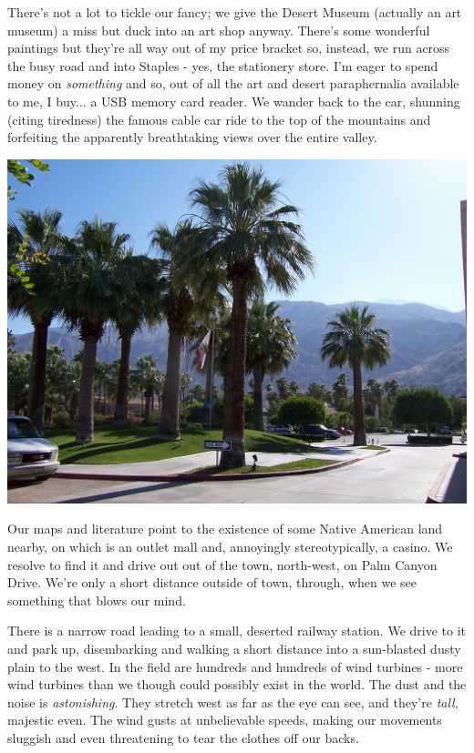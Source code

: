 \documentclass[a5paper,titlepage,11pt]{book}
\begin{document}
There's not a lot to tickle our fancy; we give the Desert Museum (actually an art museum) a miss but duck into an art shop anyway.  There's some wonderful paintings but they're all way out of my price bracket so, instead, we run across the busy road and into Staples - yes, the stationery store.  I'm eager to spend money on \emph{something} and so, out of all the art and desert paraphernalia available to me, I buy... a USB memory card reader.  We wander back to the car, shunning (citing tiredness) the famous cable car ride to the top of the mountains and forfeiting the apparently breathtaking views over the entire valley.

\begin{center}\includegraphics[width=\textwidth]{gfx/100_1625}\end{center}

Our maps and literature point to the existence of some Native American land nearby, on which is an outlet mall and, annoyingly stereotypically, a casino.  We resolve to find it and drive out out of the town, north-west, on Palm Canyon Drive. We're only a short distance outside of town, through, when we see something that blows our mind.

There is a narrow road leading to a small, deserted railway station.  We drive to it and park up, disembarking and walking a short distance into a sun-blasted dusty plain to the west.  In the field are hundreds and hundreds of wind turbines - more wind turbines than we though could possibly exist in the world.  The dust and the noise is \emph{astonishing}.  They stretch west as far as the eye can see, and they're \emph{tall}, majestic even.  The wind gusts at unbelievable speeds, making our movements sluggish and even threatening to tear the clothes off our backs.
\end{document}
